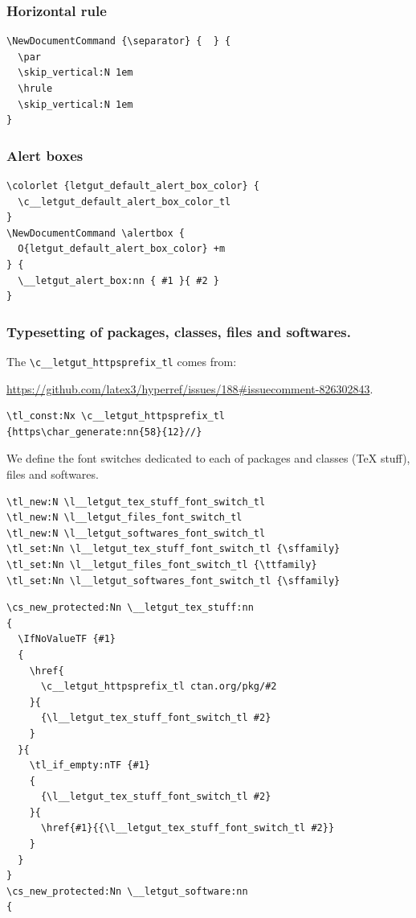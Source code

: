 \documentclass{letgut}
\begin{document}
\subsubsection{Horizontal rule}
\label{ImplementationDocumentcommandsHorizontalrule-8vsg55h0jlj0}
\begin{lstlisting}
\NewDocumentCommand {\separator} {  } {
  \par
  \skip_vertical:N 1em
  \hrule
  \skip_vertical:N 1em
}
\end{lstlisting}
\subsubsection{Alert boxes}
\label{ImplementationDocumentcommandsAlertboxes-ijtg55h0jlj0}
\begin{lstlisting}
\colorlet {letgut_default_alert_box_color} {
  \c__letgut_default_alert_box_color_tl
}
\NewDocumentCommand \alertbox {
  O{letgut_default_alert_box_color} +m
} {
  \__letgut_alert_box:nn { #1 }{ #2 }
}
\end{lstlisting}
\subsubsection{Typesetting of packages, classes, files and softwares.}
\label{ImplementationDocumentcommandsTypesettingofpackagesclassesfilesandsoftwares-09ug55h0jlj0}
The \lstinline+\c__letgut_httpsprefix_tl+ comes from:

\url{https://github.com/latex3/hyperref/issues/188\#issuecomment-826302843}.

\begin{lstlisting}
\tl_const:Nx \c__letgut_httpsprefix_tl
{https\char_generate:nn{58}{12}//}
\end{lstlisting}
We define the font switches dedicated to each of packages and classes
(\TeX{} stuff), files and softwares.
\begin{lstlisting}
\tl_new:N \l__letgut_tex_stuff_font_switch_tl
\tl_new:N \l__letgut_files_font_switch_tl
\tl_new:N \l__letgut_softwares_font_switch_tl
\tl_set:Nn \l__letgut_tex_stuff_font_switch_tl {\sffamily}
\tl_set:Nn \l__letgut_files_font_switch_tl {\ttfamily}
\tl_set:Nn \l__letgut_softwares_font_switch_tl {\sffamily}
\end{lstlisting}

\begin{lstlisting}
\cs_new_protected:Nn \__letgut_tex_stuff:nn
{
  \IfNoValueTF {#1}
  {
    \href{
      \c__letgut_httpsprefix_tl ctan.org/pkg/#2
    }{
      {\l__letgut_tex_stuff_font_switch_tl #2}
    }
  }{
    \tl_if_empty:nTF {#1}
    {
      {\l__letgut_tex_stuff_font_switch_tl #2}
    }{
      \href{#1}{{\l__letgut_tex_stuff_font_switch_tl #2}}
    }
  }
}
\cs_new_protected:Nn \__letgut_software:nn
{
\end{lstlisting}
\end{document}
